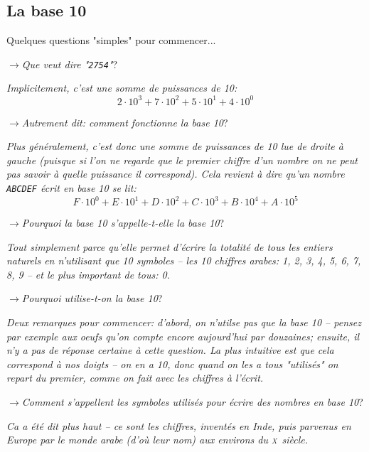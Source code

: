 \documentclass[12pt]{article}
\newcommand{\MaQuestion}[1]{\par\vspace{0.3\baselineskip}\noindent$\rightarrow$\textit{#1}?\par\vspace{0.3\baselineskip}}
\newenvironment{MaReponse}
		{\begin{greyedtextbox}\itshape} %
		{\end{greyedtextbox}}            %
\begin{document}
	 
	 \subsection{La base 10}
	 
	 Quelques questions "simples" pour commencer...
	 \MaQuestion{Que veut dire "\texttt{2754}"}
\begin{MaReponse}
	Implicitement, c'est une somme de puissances de 10: \[ 2 \cdot 10^3 + 7 \cdot 10^2 + 5 \cdot 10^1 + 4 \cdot 10^0 \]
\end{MaReponse}
	 
	 \MaQuestion{Autrement dit: comment fonctionne la base 10}
\begin{MaReponse}
	Plus généralement, c'est donc une somme de puissances de 10 lue de droite à gauche (puisque si l'on ne regarde que le premier chiffre d'un nombre on ne peut pas savoir à quelle puissance il correspond). Cela revient à dire qu'un nombre \texttt{ABCDEF} écrit en base 10 se lit: \[ F \cdot 10^0 + E \cdot 10^1 + D \cdot 10^2 + C \cdot 10^3 + B \cdot 10^4 + A \cdot 10^5\]
\end{MaReponse}

	 \MaQuestion{Pourquoi la base 10 s'appelle-t-elle la base 10}
\begin{MaReponse}
	Tout simplement parce qu'elle permet d'écrire la totalité de tous les entiers naturels en n'utilisant que 10 symboles -- les 10 chiffres arabes: 1, 2, 3, 4, 5, 6, 7, 8, 9 -- et le plus important de tous: 0.
\end{MaReponse}

	 \MaQuestion{Pourquoi utilise-t-on la base 10}
\begin{MaReponse}
	Deux remarques pour commencer: d'abord, on n'utilse pas que la base 10 -- pensez par exemple aux oeufs qu'on compte encore aujourd'hui par douzaines; ensuite, il n'y a pas de réponse certaine à cette question. La plus intuitive est que cela correspond à nos doigts -- on en a 10, donc quand on les a tous "utilisés" on repart du premier, comme on fait avec les chiffres à l'écrit.
\end{MaReponse}

	 \MaQuestion{Comment s'appellent les symboles utilisés pour écrire des nombres en base 10}
\begin{MaReponse}
	Ca a été dit plus haut -- ce sont les chiffres, inventés en Inde, puis parvenus en Europe par le monde arabe (d'où leur nom) aux environs du \textsc{x}\ieme ~siècle.
\end{MaReponse}
	 
\end{document}
